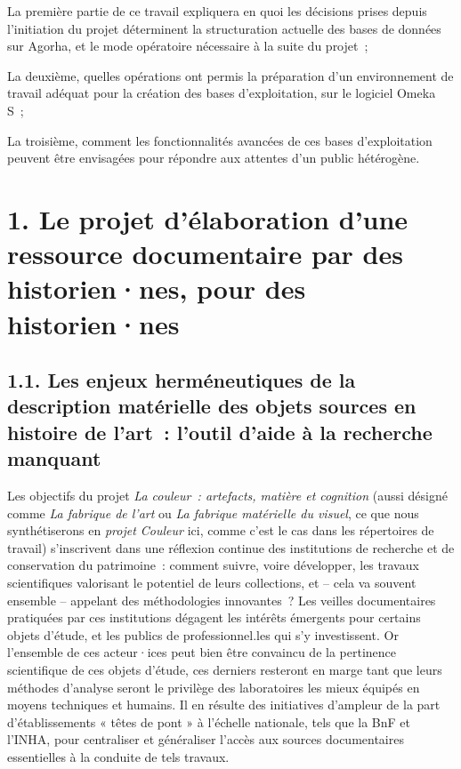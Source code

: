\documentclass[a4paper,12pt, twoside]{book}
\begin{document}
\bigskip

La première partie de ce travail expliquera en quoi les décisions prises depuis l’initiation du projet déterminent la structuration actuelle des bases de données sur Agorha, et le mode opératoire nécessaire à la suite du projet~;

La deuxième, quelles opérations ont permis la préparation d’un environnement de travail adéquat pour la création des bases d’exploitation, sur le logiciel Omeka S~;

La troisième, comment les fonctionnalités avancées de ces bases d’exploitation peuvent être envisagées pour répondre aux attentes d’un public hétérogène.

\mainmatter

\clearemptydoublepage
\chapter*{1. Le projet d’élaboration d’une ressource documentaire par des historien·nes, pour des historien·nes}

\section*{1.1. Les enjeux herméneutiques de la description matérielle des objets sources en histoire de l'art~: l’outil d’aide à la recherche manquant}

Les objectifs du projet \textit{La couleur~: artefacts, matière et cognition} (aussi désigné comme \textit{La fabrique de l’art} ou \textit{La fabrique matérielle du visuel}, ce que nous synthétiserons en \textit{projet Couleur} ici, comme c’est le cas dans les répertoires de travail) s’inscrivent dans une réflexion continue des institutions de recherche et de conservation du patrimoine~: comment suivre, voire développer, les travaux scientifiques valorisant le potentiel de leurs collections, et – cela va souvent ensemble – appelant des méthodologies innovantes~? Les veilles documentaires pratiquées par ces institutions dégagent les intérêts émergents pour certains objets d’étude, et les publics de professionnel.les qui s’y investissent. Or l’ensemble de ces acteur·ices peut bien être convaincu de la pertinence scientifique de ces objets d’étude, ces derniers resteront en marge tant que leurs méthodes d’analyse seront le privilège des laboratoires les mieux équipés en moyens techniques et humains. Il en résulte des initiatives d’ampleur de la part d’établissements « têtes de pont » à l’échelle nationale, tels que la BnF et l’INHA, pour centraliser et généraliser l’accès aux sources documentaires essentielles à la conduite de tels travaux.
\end{document}
